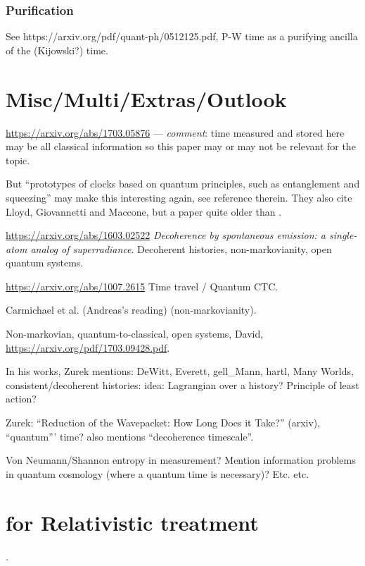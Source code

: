 \subsubsection{Purification}

See https://arxiv.org/pdf/quant-ph/0512125.pdf, P-W time as a purifying ancilla
of the (Kijowski?) time.

\section{Misc/Multi/Extras/Outlook}

\url{https://arxiv.org/abs/1703.05876}
--- \emph{comment}: time measured and stored here
may be all classical information
so this paper may or may not be relevant for the topic.

But
``prototypes of clocks based on quantum principles,
such as entanglement and squeezing''
may make this interesting again, see reference therein.
They also cite Lloyd, Giovannetti and Maccone,
but a paper quite older than \cite{Lloyd:Time}.

\url{https://arxiv.org/abs/1603.02522}
\emph{Decoherence by spontaneous emission: a single-atom analog of superradiance}.
Decoherent histories, non-markovianity, open quantum systems.

\url{https://arxiv.org/abs/1007.2615} Time travel / Quantum CTC.

Carmichael et al. \cite{CarmichaelOQS2017} (Andreas's reading)
(non-markovianity).

Non-markovian, quantum-to-classical, open systems, David,
\url{https://arxiv.org/pdf/1703.09428.pdf}.

In his works, Zurek mentions:
DeWitt, Everett, gell_Mann, hartl, Many Worlds, consistent/decoherent histories:
idea: Lagrangian over a history? Principle of least action?

Zurek: ``Reduction of the Wavepacket: How Long Does it Take?'' (arxiv),
``quantum''' time? \cite{Zurek_Einselect} also mentions
``decoherence timescale''.

Von Neumann/Shannon entropy in measurement? Mention information problems
in quantum cosmology (where a quantum time is necessary)? Etc. etc.

\section{for Relativistic treatment}

\cite{RealisticClocks}.

